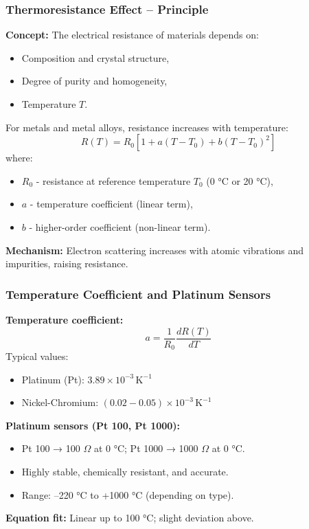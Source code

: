 \begin{frame}
	\frametitle{Thermoresistance Effect -- Principle}
    \small
    \textbf{Concept:}
    The electrical resistance of materials depends on:
    \begin{itemize}
        \item Composition and crystal structure,
        \item Degree of purity and homogeneity,
        \item Temperature $T$.
    \end{itemize}
    For metals and metal alloys, resistance increases with temperature:
    \begin{equation}
        R(T) = R_0 \left[1 + a(T - T_0) + b(T - T_0)^2 \right]
    \end{equation}
    where:
    \begin{itemize}
        \item $R_0$ - resistance at reference temperature $T_0$ (0 °C or 20 °C),
        \item $a$ - temperature coefficient (linear term),
        \item $b$ - higher-order coefficient (non-linear term).
    \end{itemize}
    \textbf{Mechanism:} Electron scattering increases with atomic vibrations and impurities, raising resistance.
\end{frame}

\begin{frame}
	\frametitle{Temperature Coefficient and Platinum Sensors}
    \small
    \textbf{Temperature coefficient:}
    \begin{equation}
        a = \frac{1}{R_0}\frac{dR(T)}{dT}
    \end{equation}
    Typical values:
    \begin{itemize}
        \item Platinum (Pt): $3.89 \times 10^{-3}\,\mathrm{K^{-1}}$
        \item Nickel-Chromium: $(0.02 - 0.05) \times 10^{-3}\,\mathrm{K^{-1}}$
    \end{itemize}
    \textbf{Platinum sensors (Pt 100, Pt 1000):}
    \begin{itemize}
        \item Pt 100 → 100 $\Omega$ at 0 °C; Pt 1000 → 1000 $\Omega$ at 0 °C.
        \item Highly stable, chemically resistant, and accurate.
        \item Range: –220 °C to +1000 °C (depending on type).
    \end{itemize}
    \textbf{Equation fit:} Linear up to 100 °C; slight deviation above.
\end{frame}

